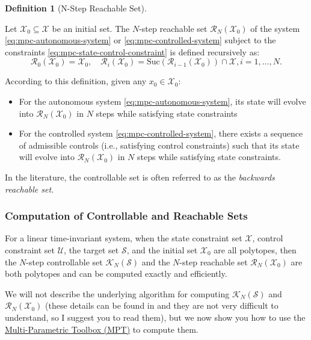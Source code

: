 \documentclass[
]{book}
\theoremstyle{definition}
\newtheorem{definition}{Definition}[chapter]
\theoremstyle{definition}
\theoremstyle{definition}
\theoremstyle{definition}
\theoremstyle{remark}
\begin{document}
\begin{definition}[N-Step Reachable Set]
\protect\hypertarget{def:reachable-set}{}\label{def:reachable-set}

Let \(\mathcal{X}_0 \subseteq \mathcal{X}\) be an initial set. The \(N\)-step reachable set \(\mathcal{R}_N (\mathcal{X}_0)\) of the system \eqref{eq:mpc-autonomous-system} or \eqref{eq:mpc-controlled-system} subject to the constraints \eqref{eq:mpc-state-control-constraint} is defined recursively as:
\[
\mathcal{R}_0(\mathcal{X}_0) = \mathcal{X}_0, \quad \mathcal{R}_{i}(\mathcal{X}_0) = \text{Suc}(\mathcal{R}_{i-1}(\mathcal{X}_0)) \cap \mathcal{X}, i=1,\dots,N.
\]

According to this definition, given any \(x_0 \in \mathcal{X}_0\):

\begin{itemize}
\item
  For the autonomous system \eqref{eq:mpc-autonomous-system}, its state will evolve into \(\mathcal{R}_N(\mathcal{X}_0)\) in \(N\) steps while satisfying state constraints
\item
  For the controlled system \eqref{eq:mpc-controlled-system}, there exists a sequence of admissible controls (i.e., satisfying control constraints) such that its state will evolve into \(\mathcal{R}_N(\mathcal{X}_0)\) in \(N\) steps while satisfying state constraints.
\end{itemize}

\end{definition}

In the literature, the controllable set is often referred to as the \emph{backwards reachable set}.

\hypertarget{computation-of-controllable-and-reachable-sets}{%
\subsubsection{Computation of Controllable and Reachable Sets}\label{computation-of-controllable-and-reachable-sets}}

For a linear time-invariant system, when the state constraint set \(\mathcal{X}\), control constraint set \(\mathcal{U}\), the target set \(\mathcal{S}\), and the initial set \(\mathcal{X}_0\) are all polytopes, then the \(N\)-step controllable set \(\mathcal{K}_{N}(\mathcal{S})\) and the \(N\)-step reachable set \(\mathcal{R}_{N}(\mathcal{X}_0)\) are both polytopes and can be computed exactly and efficiently.

We will not describe the underlying algorithm for computing \(\mathcal{K}_{N}(\mathcal{S})\) and \(\mathcal{R}_{N}(\mathcal{X}_0)\) (these details can be found in \citep{borrelli17book-mpc} and they are not very difficult to understand, so I suggest you to read them), but we now show you how to use the \href{https://www.mpt3.org/}{Multi-Parametric Toolbox (MPT)} to compute them.
\end{document}
